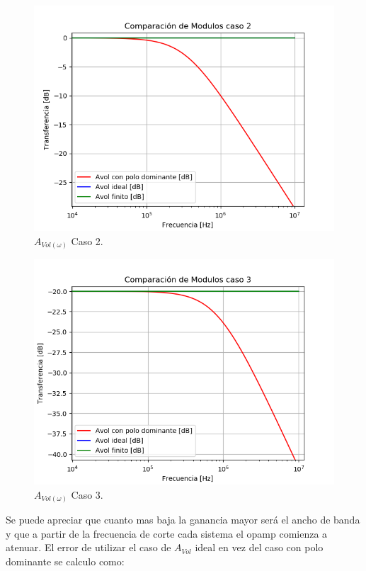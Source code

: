 \begin{figure}[H]	
	\centering
	\includegraphics[width=\textwidth]{Ejercicio1/Imagenes/HCompC2.png}
	\caption{$A_{Vol(\omega)}$ Caso 2.}
	\label{fig:AvolC2}
\end{figure}
\begin{figure}[H]	
	\centering
	\includegraphics[width=\textwidth]{Ejercicio1/Imagenes/HCompC3.png}
	\caption{$A_{Vol(\omega)}$ Caso 3.}
	\label{fig:AvolC3}
\end{figure}
Se puede apreciar que cuanto mas baja la ganancia mayor será el ancho de banda y que a partir de la frecuencia de corte cada sistema el opamp comienza a atenuar.
El error de utilizar el caso de $A_{Vol}$ ideal en vez del caso con polo dominante se calculo como:
